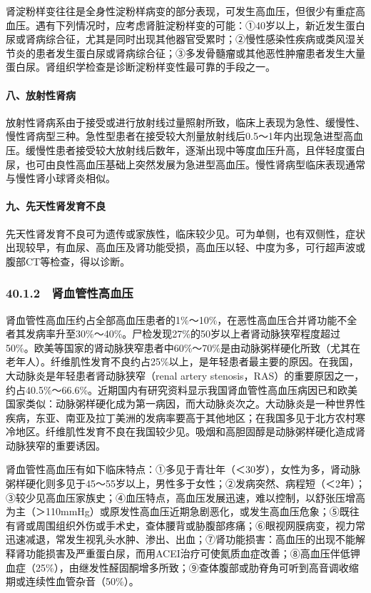 肾淀粉样变往往是全身性淀粉样病变的部分表现，可发生高血压，但很少有重症高血压。遇有下列情况时，应考虑肾脏淀粉样变的可能：①40岁以上，新近发生蛋白尿或肾病综合征，尤其是同时出现其他器官受累时；②慢性感染性疾病或类风湿关节炎的患者发生蛋白尿或肾病综合征；③多发骨髓瘤或其他恶性肿瘤患者发生大量蛋白尿。肾组织学检查是诊断淀粉样变性最可靠的手段之一。

\paragraph{八、放射性肾病}

放射性肾病系由于接受或进行放射线过量照射所致，临床上表现为急性、缓慢性、慢性肾病型三种。急性型患者在接受较大剂量放射线后0.5～1年内出现急进型高血压。缓慢性患者接受较大放射线后数年，逐渐出现中等度血压升高，且伴轻度蛋白尿，也可由良性高血压基础上突然发展为急进型高血压。慢性肾病型临床表现通常与慢性肾小球肾炎相似。

\paragraph{九、先天性肾发育不良}

先天性肾发育不良可为遗传或家族性，临床较少见。可为单侧，也有双侧性，症状出现较早，有血尿、高血压及肾功能受损，高血压以轻、中度为多，可行超声波或腹部CT等检查，得以诊断。

\subsubsection{40.1.2　肾血管性高血压}

肾血管性高血压约占全部高血压患者的1\%～10\%，在恶性高血压合并肾功能不全者其发病率升至30\%～40\%。尸检发现27\%的50岁以上者肾动脉狭窄程度超过50\%。欧美等国家的肾动脉狭窄患者中60\%～70\%是由动脉粥样硬化所致（尤其在老年人）。纤维肌性发育不良约占25\%以上，是年轻患者最主要的原因。在我国，大动脉炎是年轻患者肾动脉狭窄（renal
artery
stenosis，RAS）的重要原因之一，约占40.5\%～66.6\%。近期国内有研究资料显示我国肾血管性高血压病因已和欧美国家类似：动脉粥样硬化成为第一病因，而大动脉炎次之。大动脉炎是一种世界性疾病，东亚、南亚及拉丁美洲的发病率要高于其他地区；在我国多见于北方农村寒冷地区。纤维肌性发育不良在我国较少见。吸烟和高胆固醇是动脉粥样硬化造成肾动脉狭窄的重要诱因。

肾血管性高血压有如下临床特点：①多见于青壮年（＜30岁），女性为多，肾动脉粥样硬化则多见于45～55岁以上，男性多于女性；②发病突然、病程短（＜2年）；③较少见高血压家族史；④血压特点，高血压发展迅速，难以控制，以舒张压增高为主（＞110mmHg）或原发性高血压近期急剧恶化，或发生高血压危象；⑤既往有肾或周围组织外伤或手术史，查体腰背或胁腹部疼痛；⑥眼视网膜病变，视力常迅速减退，常发生视乳头水肿、渗出、出血；⑦肾功能损害：高血压的出现不能解释肾功能损害及严重蛋白尿，而用ACEI治疗可使氮质血症改善；⑧高血压伴低钾血症（25\%），由继发性醛固酮增多所致；⑨查体腹部或肋脊角可听到高音调收缩期或连续性血管杂音（50\%）。

